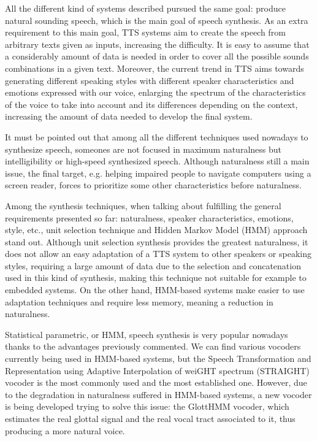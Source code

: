 All the different kind of systems described pursued the same goal: produce natural sounding speech, which is the main goal of speech synthesis. As an extra requirement to this main goal, TTS systems aim to create the speech from arbitrary texts given as inputs, increasing the difficulty. It is easy to assume that a considerably amount of data is needed in order to cover all the possible sounds combinations in a given text. Moreover, the current trend in TTS aims towards generating different speaking styles with different speaker characteristics and emotions expressed with our voice, enlarging the spectrum of the characteristics of the voice to take into account and its differences depending on the context, increasing the amount of data needed to develop the final system. 

It must be pointed out that among all the different techniques used nowadays to synthesize speech, someones are not focused in maximum naturalness but intelligibility or high-speed synthesized speech. Although naturalness still a main issue, the final target, e.g. helping impaired people to navigate computers using a screen reader, forces to prioritize some other characteristics before naturalness. 

Among the synthesis techniques, when talking about fulfilling the general requirements presented so far: naturalness, speaker characteristics, emotions, style, etc., unit selection technique and Hidden Markov Model (HMM) approach stand out. Although unit selection synthesis provides the greatest naturalness, it does not allow an easy adaptation of a TTS system to other speakers or speaking styles, requiring a large amount of data due to the selection and concatenation used in this kind of synthesis, making this technique not suitable for example to embedded systems. On the other hand, HMM-based systems make easier to use adaptation techniques and require less memory, meaning a reduction in naturalness.

Statistical parametric, or HMM, speech synthesis is very popular nowadays thanks to the advantages previously commented. We can find various vocoders currently being used in HMM-based systems, but the Speech Transformation and Representation using Adaptive Interpolation of weiGHT spectrum (STRAIGHT) vocoder is the most commonly used and the most established one. However, due to the degradation in naturalness suffered in HMM-based systems, a new vocoder is being developed trying to solve this issue: the GlottHMM vocoder, which estimates the real glottal signal and the real vocal tract associated to it, thus producing a more natural voice. 

